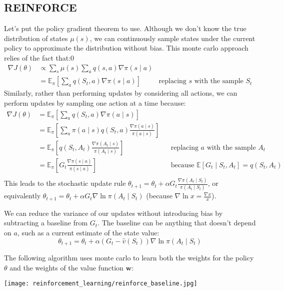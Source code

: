 \subsection{REINFORCE}
Let's put the policy gradient theorem to use. Although we don't know the true distribution of states $\mu(s)$, we can continuously sample states under the current policy to approximate the distribution without bias. This monte carlo approach relies of the fact that:0
\begin{align*}
\nabla J(\theta)
&\propto \sum_{s} \mu(s) \sum_a q(s,a) \nabla \pi(s \mid a) \\
&= \mathbb{E}_\pi \left[ \sum_a q(S_t,a) \nabla \pi(s \mid a) \right] & \scriptstyle{\text{replacing $s$ with the sample $S_t$}}
\end{align*}
Similarly, rather than performing updates by considering all actions, we can perform updates by sampling one action at a time because:
\begin{align*}
\nabla J(\theta)
&= \mathbb{E}_\pi \left[ \sum_a q(S_t,a) \nabla \pi(a \mid s) \right] \\
&= \mathbb{E}_\pi \left[ \sum_a \pi(a \mid s) q(S_t,a) \frac{\nabla \pi(a \mid s)}{\pi(a \mid s)} \right] \\
&= \mathbb{E}_\pi \left[q(S_t, A_t) \frac{\nabla \pi(A_t \mid s)}{\pi(A_t \mid s)} \right] && \scriptstyle{\text{replacing $a$ with the sample $A_t$}} \\
&= \mathbb{E}_\pi \left[ G_t \frac{\nabla \pi(s \mid a)}{\pi(s \mid a)} \right] && \scriptstyle{\text{because $\mathbb{E}[G_t \mid S_t, A_t] = q(S_t,A_t)$}} \\
\end{align*}
This leads to the stochastic update rule $\theta_{t+1} = \theta_t + \alpha G_t \frac{\nabla \pi(A_t \mid S_t)}{\pi(A_t \mid S_t)}$, or equivalently $\theta_{t+1} = \theta_t + \alpha G_t \nabla \ln \pi(A_t \mid S_t)$ (because $\nabla \ln x = \frac{\nabla x}{x}$).

We can reduce the variance of our updates without introducing bias by subtracting a baseline from $G_t$. The baseline can be anything that doesn't depend on $a$, such as a current estimate of the state value:
$$ \theta_{t+1} = \theta_t + \alpha (G_t - \hat{v}(S_t)) \nabla \ln \pi(A_t \mid S_t) $$

The following algorithm uses monte carlo to learn both the weights for the policy $\theta$ and the weights of the value function $\mathbf{w}$:
\begin{center}\texttt{[image: reinforcement\_learning/reinforce\_baseline.jpg]}\end{center}


